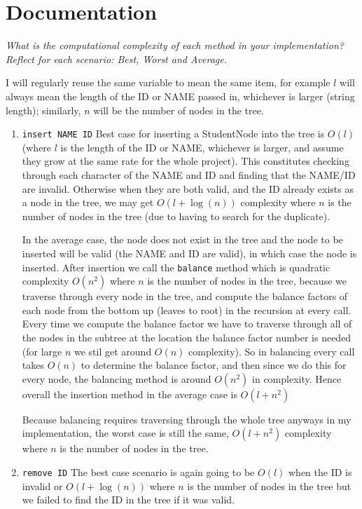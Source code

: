 \documentclass[11pt]{article}
\begin{document}
\section{Documentation}
\textit{What is the computational complexity of each method in your implementation? Reflect for each scenario: Best, Worst and Average.}

I will regularly reuse the same variable to mean the same item, for example $l$ will always mean the length of the ID or NAME passed in, whichever is larger (string length); similarly, $n$ will be the number of nodes in the tree.

\begin{enumerate}
  \item \texttt{insert NAME ID} Best case for inserting a StudentNode into the tree is $O(l)$ (where $l$ is the length of the ID or NAME, whichever is larger, and assume they grow at the same rate for the whole project). This constitutes checking through each character of the NAME and ID and finding that the NAME/ID are invalid. Otherwise when they are both valid, and the ID already exists as a node in the tree, we may get $O(l + \log(n))$ complexity where $n$ is the number of nodes in the tree (due to having to search for the duplicate).
  
  In the average case, the node does not exist in the tree and the node to be inserted will be valid (the NAME and ID are valid), in which case the node is inserted. After insertion we call the \texttt{balance} method which is quadratic complexity $O(n^2)$ where $n$ is the number of nodes in the tree, because we traverse through every node in the tree, and compute the balance factors of each node from the bottom up (leaves to root) in the recursion at every call. Every time we compute the balance factor we have to traverse through all of the nodes in the subtree at the location the balance factor number is needed (for large $n$ we stil get around $O(n)$ complexity). So in balancing every call takes $O(n)$ to determine the balance factor, and then since we do this for every node, the balancing method is around $O(n^2)$ in complexity. Hence overall the insertion method in the average case is $O(l+n^2)$

  Because balancing requires traversing through the whole tree anyways in my implementation, the worst case is still the same, $O(l+n^2)$ complexity where $n$ is the number of nodes in the tree.
  \item \texttt{remove ID} The best case scenario is again going to be $O(l)$ when the ID is invalid or $O(l+\log(n))$ where $n$ is the number of nodes in the tree but we failed to find the ID in the tree if it was valid.
  

\end{enumerate}
\end{document}
